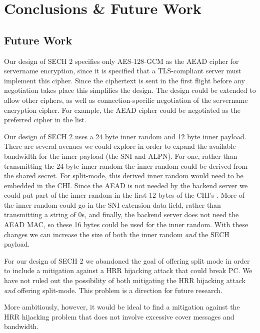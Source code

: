 \chapter{Conclusions \& Future Work}
\label{chap:Conclusions}


\section{Future Work}

Our design of \ac{SECH} 2 specifies only \ac{AES}-128-\ac{GCM} as the \ac{AEAD} cipher for servername encryption, since
it is specified that a \ac{TLS}-compliant
server must implement this cipher.
Since the ciphertext is sent in the first flight before any negotiation takes place this simplifies the design.
The design could be extended to allow other ciphers,
as well as connection-specific negotiation of the servername encryption cipher.
For example, the \ac{AEAD} cipher could be negotiated as the preferred cipher in the 
 list.

Our design of \ac{SECH} 2 uses a 24 byte inner random and 12 byte inner payload.
There are several avenues we could explore in order to expand the available bandwidth for the inner payload (the \ac{SNI} and \ac{ALPN}).
For one, rather than transmitting the 24 byte inner random the inner random could be derived from the shared secret.
For split-mode, this derived inner random would need to be embedded in the \ac{CHI}.
Since the \ac{AEAD} \nonce is not needed by the backend server we could put part of the inner random in the first 12 bytes of the \ac{CHI}'s .
More of the inner random could go in the \ac{SNI} extension data field, rather than transmitting a string of 0s, and finally,
the backend server does not need the \ac{AEAD} \ac{MAC}, so these 16 bytes could be used for the inner random.
With these changes we can increase the size of both the inner random {\em and} the \ac{SECH} payload.

For our design of \ac{SECH} 2 we abandoned the goal of offering
split mode in order to include a mitigation
against a \ac{HRR} hijacking attack that could break \ac{PC}.
We have not ruled out the possibility of both mitigating the
\ac{HRR} hijacking attack {\em and} offering split-mode.
This problem is a direction for future research.

More ambitiously, however, it would be ideal to find
a mitigation against the \ac{HRR} hijacking problem that
does not involve excessive cover messages and bandwidth.




